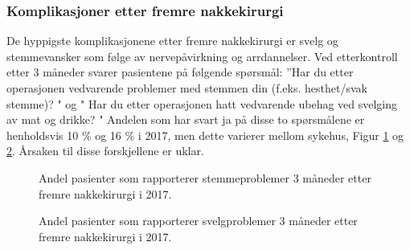 \documentclass [norsk,a4paper,twoside]{article}\usepackage[]{graphicx}\usepackage[]{color}
\begin{document}
\clearpage

\subsubsection{Komplikasjoner etter fremre nakkekirurgi}
De hyppigste komplikasjonene etter fremre nakkekirurgi er svelg og stemmevansker som følge 
av nervepåvirkning og arrdannelser. Ved etterkontroll etter 3 måneder svarer pasientene på
følgende spørsmål: ''Har du etter operasjonen vedvarende problemer med stemmen din 
(f.eks. hesthet/svak stemme)? " og " Har du etter operasjonen hatt vedvarende ubehag ved svelging av mat og drikke? "
Andelen som har svart ja på disse to spørsmålene er henholdsvis 10 \% og 16 \% i 2017, men dette  varierer mellom sykehus, Figur \ref{fig:NakkeStemme3mndSh} og \ref{fig:NakkeSvelg3mndSh}. Årsaken til disse forskjellene er uklar. 


\begin{figure}[ht]
\caption{\label{fig:NakkeStemme3mndSh} Andel pasienter som rapporterer stemmeproblemer 3 måneder etter fremre nakkekirurgi i 2017.}
\end{figure}

\begin{figure}[ht]
\caption{\label{fig:NakkeSvelg3mndSh} Andel pasienter som rapporterer svelgproblemer 3 måneder etter fremre nakkekirurgi i 2017.}
\end{figure}







      
      
 
\end{document}
